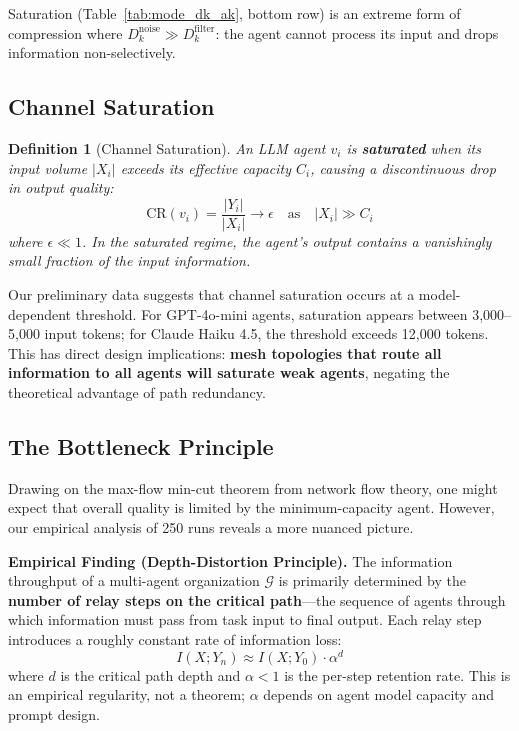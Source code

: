 \documentclass[conference]{IEEEtran}
\newtheorem{definition}{Definition}
\begin{document}
Saturation (Table~\ref{tab:mode_dk_ak}, bottom row) is an extreme form of compression where $D_k^{\text{noise}} \gg D_k^{\text{filter}}$: the agent cannot process its input and drops information non-selectively.

\subsection{Channel Saturation}
\label{subsec:saturation}

\begin{definition}[Channel Saturation]
An LLM agent $v_i$ is \textbf{saturated} when its input volume $|X_i|$ exceeds its effective capacity $C_i$, causing a discontinuous drop in output quality:
\begin{equation}
    \text{CR}(v_i) = \frac{|Y_i|}{|X_i|} \to \epsilon \quad \text{as} \quad |X_i| \gg C_i
\end{equation}
where $\epsilon \ll 1$.
In the saturated regime, the agent's output contains a vanishingly small fraction of the input information.
\end{definition}


Our preliminary data suggests that channel saturation occurs at a model-dependent threshold.
For GPT-4o-mini agents, saturation appears between 3,000--5,000 input tokens; for Claude Haiku 4.5, the threshold exceeds 12,000 tokens.
This has direct design implications: \textbf{mesh topologies that route all information to all agents will saturate weak agents}, negating the theoretical advantage of path redundancy.

\subsection{The Bottleneck Principle}
\label{subsec:bottleneck}

Drawing on the max-flow min-cut theorem from network flow theory, one might expect that overall quality is limited by the minimum-capacity agent.
However, our empirical analysis of 250 runs reveals a more nuanced picture.

\noindent\textbf{Empirical Finding (Depth-Distortion Principle).}
The information throughput of a multi-agent organization $\mathcal{G}$ is primarily determined by the \textbf{number of relay steps on the critical path}---the sequence of agents through which information must pass from task input to final output.
Each relay step introduces a roughly constant rate of information loss:
\begin{equation}
    I(X; Y_n) \approx I(X; Y_0) \cdot \alpha^d
    \label{eq:depth_distortion}
\end{equation}
where $d$ is the critical path depth and $\alpha < 1$ is the per-step retention rate.
This is an empirical regularity, not a theorem; $\alpha$ depends on agent model capacity and prompt design.
\end{document}
